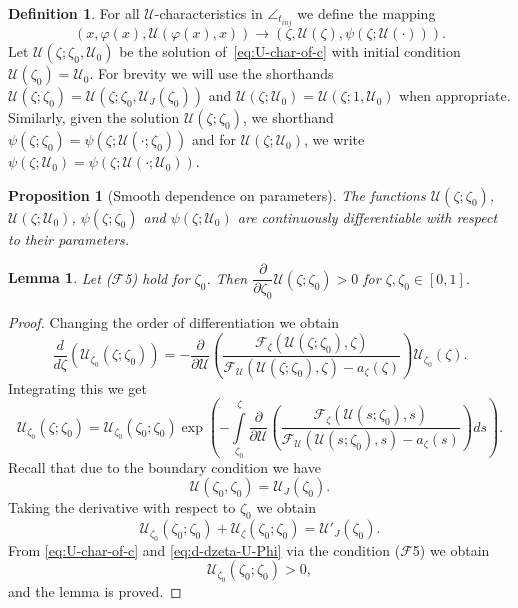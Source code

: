 \documentclass[12pt]{article}
\newtheorem{lemma}{Lemma}
\newtheorem{proposition}{Proposition}
\theoremstyle{definition}
\newtheorem{definition}{Definition}
\begin{document}
\begin{definition}
\label{def:mapping_and_solution_shorthands}
For all $\mathcal U$-characteristics in $\angle_{t_{inj}}$ we define the mapping
\begin{equation}
\label{eq:mapping_into_zeta_U}
(x, \varphi(x), \mathcal U(\varphi(x), x)) \to (\zeta, \mathcal U(\zeta), \psi(\zeta; \mathcal U(\cdot))).
\end{equation}
Let $\mathcal U(\zeta;\zeta_0, \mathcal U_0)$ be the solution of~\eqref{eq:U-char-of-c} with initial condition $\mathcal U(\zeta_0) = \mathcal U_0$. For brevity we will use the shorthands $\mathcal U(\zeta;\zeta_0) = \mathcal U(\zeta;\zeta_0, \mathcal U_J(\zeta_0))$ and $\mathcal U(\zeta;\mathcal U_0) = \mathcal U(\zeta;1, \mathcal U_0)$ when appropriate. Similarly, given the solution $\mathcal U(\zeta;\zeta_0)$, we shorthand $\psi(\zeta; \zeta_0) = \psi(\zeta; \mathcal U(\cdot;\zeta_0))$ and for $\mathcal U(\zeta;\mathcal U_0)$, we write $\psi(\zeta;\mathcal U_0) = \psi(\zeta; \mathcal U(\cdot;\mathcal U_0))$.
\end{definition}

\begin{proposition}[Smooth dependence on parameters]
\label{prop:continuous_differential_by_parameter}
The functions $\mathcal U(\zeta;\zeta_0)$, $\mathcal U(\zeta;\mathcal U_0)$, $\psi(\zeta; \zeta_0)$ and $\psi(\zeta;\mathcal U_0)$ are continuously differentiable with respect to their parameters.
\end{proposition}


\begin{lemma}
\label{lemma_dU_dzeta0}
Let ($\mathcal F$5) hold for $\zeta_0$. Then $\dfrac{\partial}{\partial {\zeta_0}}\mathcal U(\zeta; \zeta_0) > 0$ for $\zeta, \zeta_0 \in [0,1]$.
\end{lemma}
\begin{proof}
Changing the order of differentiation we obtain
    \begin{equation*}
\frac{d}{d\zeta}\left(\mathcal U_{\zeta_0}(\zeta; \zeta_0)\right) = -\frac{\partial}{\partial\mathcal U}\left(\dfrac{\mathcal F_{\zeta}(\mathcal U(\zeta; \zeta_0), \zeta)}{\mathcal F_{\mathcal U}(\mathcal U(\zeta; \zeta_0), \zeta) - a_\zeta(\zeta)}\right)\mathcal U_{\zeta_0}(\zeta).  
\end{equation*}
Integrating this we get
\begin{equation*}
    \mathcal U_{\zeta_0}(\zeta; \zeta_0) = \mathcal U_{\zeta_0}(\zeta_0; \zeta_0) \exp\left(-\int\limits_{\zeta_0}^\zeta \frac{\partial}{\partial\mathcal U}\left(\dfrac{\mathcal F_{\zeta}(\mathcal U(s; \zeta_0), s)}{\mathcal F_{\mathcal U}(\mathcal U(s; \zeta_0), s) - a_\zeta(s)}\right)ds\right).
\end{equation*}
Recall that due to the boundary condition we have
\[
\mathcal U(\zeta_0, \zeta_0) = \mathcal U_J(\zeta_0).
\]
Taking the derivative with respect to $\zeta_0$ we obtain
\[
\mathcal U_{\zeta_0}(\zeta_0; \zeta_0) + \mathcal U_{\zeta}(\zeta_0; \zeta_0) = \mathcal U'_J(\zeta_0).
\]
From \eqref{eq:U-char-of-c} and \eqref{eq:d-dzeta-U-Phi} via the condition ($\mathcal F$5) we obtain 
\[
\mathcal U_{\zeta_0}(\zeta_0; \zeta_0) > 0,
\]
and the lemma is proved.
\end{proof}
\end{document}
